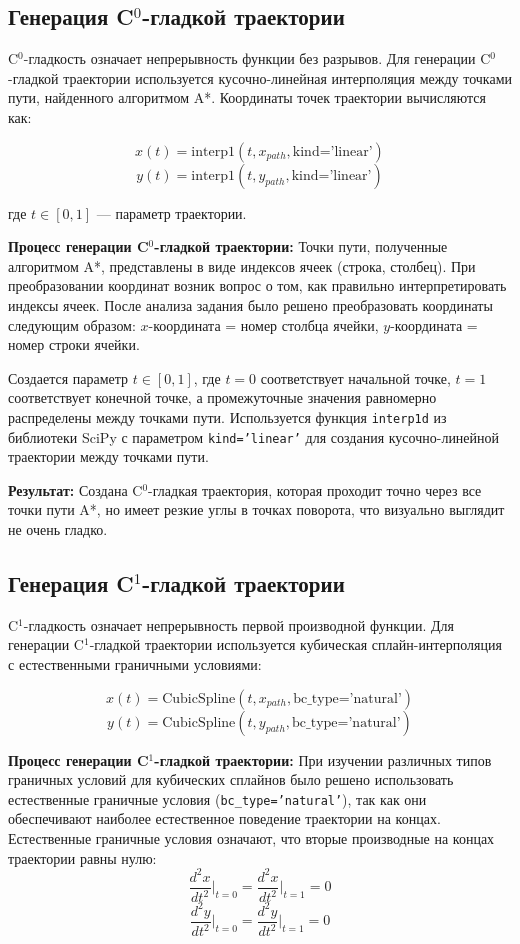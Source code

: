 \subsection{Генерация C$^0$-гладкой траектории}

C$^0$-гладкость означает непрерывность функции без разрывов. Для генерации C$^0$-гладкой траектории используется кусочно-линейная интерполяция между точками пути, найденного алгоритмом A*. Координаты точек траектории вычисляются как:

$$x(t) = \text{interp1}(t, x_{path}, \text{kind='linear'})$$
$$y(t) = \text{interp1}(t, y_{path}, \text{kind='linear'})$$

где $t \in [0, 1]$ --- параметр траектории.

\textbf{Процесс генерации C$^0$-гладкой траектории:} Точки пути, полученные алгоритмом A*, представлены в виде индексов ячеек (строка, столбец). При преобразовании координат возник вопрос о том, как правильно интерпретировать индексы ячеек. После анализа задания было решено преобразовать координаты следующим образом: $x$-координата = номер столбца ячейки, $y$-координата = номер строки ячейки. 

Создается параметр $t \in [0, 1]$, где $t = 0$ соответствует начальной точке, $t = 1$ соответствует конечной точке, а промежуточные значения равномерно распределены между точками пути. Используется функция \texttt{interp1d} из библиотеки SciPy с параметром \texttt{kind='linear'} для создания кусочно-линейной траектории между точками пути.

\textbf{Результат:} Создана C$^0$-гладкая траектория, которая проходит точно через все точки пути A*, но имеет резкие углы в точках поворота, что визуально выглядит не очень гладко.

\subsection{Генерация C$^1$-гладкой траектории}

C$^1$-гладкость означает непрерывность первой производной функции. Для генерации C$^1$-гладкой траектории используется кубическая сплайн-интерполяция с естественными граничными условиями:

$$x(t) = \text{CubicSpline}(t, x_{path}, \text{bc\_type='natural'})$$
$$y(t) = \text{CubicSpline}(t, y_{path}, \text{bc\_type='natural'})$$

\textbf{Процесс генерации C$^1$-гладкой траектории:} При изучении различных типов граничных условий для кубических сплайнов было решено использовать естественные граничные условия (\texttt{bc\_type='natural'}), так как они обеспечивают наиболее естественное поведение траектории на концах. Естественные граничные условия означают, что вторые производные на концах траектории равны нулю:
$$\frac{d^2x}{dt^2}\bigg|_{t=0} = \frac{d^2x}{dt^2}\bigg|_{t=1} = 0$$
$$\frac{d^2y}{dt^2}\bigg|_{t=0} = \frac{d^2y}{dt^2}\bigg|_{t=1} = 0$$

